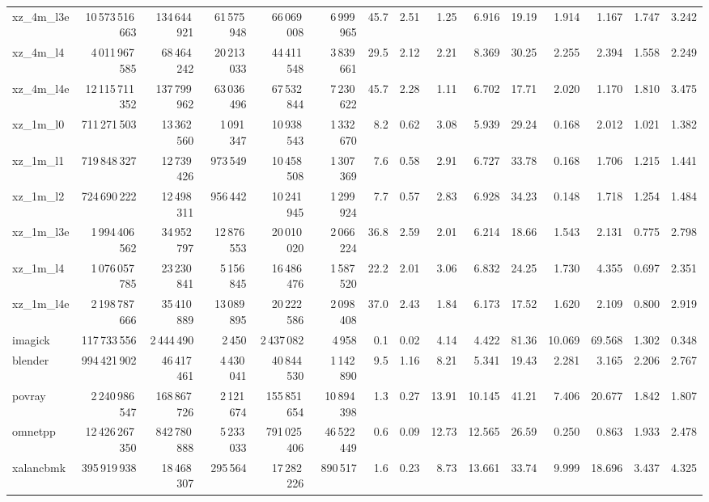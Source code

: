 \documentclass[9pt,landscape,a4paper]{article}
\begin{document}
\begin{adjustbox}{max width=\textwidth, max totalheight=0.50\textheight}
\begin{tabular}{lrrrrrrrrrrrrrr}
xz\_4m\_l3e & 10\,573\,516\,663 & 134\,644\,921 & 61\,575\,948 & 66\,069\,008 & 6\,999\,965 & 45.7 & 2.51 & 1.25 & 6.916 & 19.19 & 1.914 & 1.167 & 1.747 & 3.242 \\
xz\_4m\_l4 & 4\,011\,967\,585 & 68\,464\,242 & 20\,213\,033 & 44\,411\,548 & 3\,839\,661 & 29.5 & 2.12 & 2.21 & 8.369 & 30.25 & 2.255 & 2.394 & 1.558 & 2.249 \\
xz\_4m\_l4e & 12\,115\,711\,352 & 137\,799\,962 & 63\,036\,496 & 67\,532\,844 & 7\,230\,622 & 45.7 & 2.28 & 1.11 & 6.702 & 17.71 & 2.020 & 1.170 & 1.810 & 3.475 \\
xz\_1m\_l0 & 711\,271\,503 & 13\,362\,560 & 1\,091\,347 & 10\,938\,543 & 1\,332\,670 & 8.2 & 0.62 & 3.08 & 5.939 & 29.24 & 0.168 & 2.012 & 1.021 & 1.382 \\
xz\_1m\_l1 & 719\,848\,327 & 12\,739\,426 & 973\,549 & 10\,458\,508 & 1\,307\,369 & 7.6 & 0.58 & 2.91 & 6.727 & 33.78 & 0.168 & 1.706 & 1.215 & 1.441 \\
xz\_1m\_l2 & 724\,690\,222 & 12\,498\,311 & 956\,442 & 10\,241\,945 & 1\,299\,924 & 7.7 & 0.57 & 2.83 & 6.928 & 34.23 & 0.148 & 1.718 & 1.254 & 1.484 \\
xz\_1m\_l3e & 1\,994\,406\,562 & 34\,952\,797 & 12\,876\,553 & 20\,010\,020 & 2\,066\,224 & 36.8 & 2.59 & 2.01 & 6.214 & 18.66 & 1.543 & 2.131 & 0.775 & 2.798 \\
xz\_1m\_l4 & 1\,076\,057\,785 & 23\,230\,841 & 5\,156\,845 & 16\,486\,476 & 1\,587\,520 & 22.2 & 2.01 & 3.06 & 6.832 & 24.25 & 1.730 & 4.355 & 0.697 & 2.351 \\
xz\_1m\_l4e & 2\,198\,787\,666 & 35\,410\,889 & 13\,089\,895 & 20\,222\,586 & 2\,098\,408 & 37.0 & 2.43 & 1.84 & 6.173 & 17.52 & 1.620 & 2.109 & 0.800 & 2.919 \\
imagick & 117\,733\,556 & 2\,444\,490 & 2\,450 & 2\,437\,082 & 4\,958 & 0.1 & 0.02 & 4.14 & 4.422 & 81.36 & 10.069 & 69.568 & 1.302 & 0.348 \\
blender & 994\,421\,902 & 46\,417\,461 & 4\,430\,041 & 40\,844\,530 & 1\,142\,890 & 9.5 & 1.16 & 8.21 & 5.341 & 19.43 & 2.281 & 3.165 & 2.206 & 2.767 \\
povray & 2\,240\,986\,547 & 168\,867\,726 & 2\,121\,674 & 155\,851\,654 & 10\,894\,398 & 1.3 & 0.27 & 13.91 & 10.145 & 41.21 & 7.406 & 20.677 & 1.842 & 1.807 \\
omnetpp & 12\,426\,267\,350 & 842\,780\,888 & 5\,233\,033 & 791\,025\,406 & 46\,522\,449 & 0.6 & 0.09 & 12.73 & 12.565 & 26.59 & 0.250 & 0.863 & 1.933 & 2.478 \\
xalancbmk & 395\,919\,938 & 18\,468\,307 & 295\,564 & 17\,282\,226 & 890\,517 & 1.6 & 0.23 & 8.73 & 13.661 & 33.74 & 9.999 & 18.696 & 3.437 & 4.325 \\

\end{tabular}
\end{adjustbox}
\end{document}
